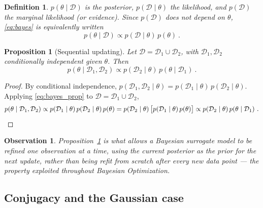 \documentclass{article}
\newtheorem{prop}{Proposition}
\newtheorem{defn}{Definition}
\newtheorem{obs}{Observation}
\begin{document}
	\begin{defn}
		$p(\theta \mid \mathcal{D})$ is the \textit{posterior}, $p(\mathcal{D} \mid \theta)$ the \textit{likelihood}, and $p(\mathcal{D})$ the \textit{marginal likelihood} (or \textit{evidence}). Since $p(\mathcal{D})$ does not depend on $\theta$, \eqref{eq:bayes} is equivalently written
		\begin{equation} \label{eq:bayes_prop}
			p(\theta \mid \mathcal{D}) \propto p(\mathcal{D} \mid \theta) \, p(\theta) \ .
		\end{equation}
	\end{defn}
	
	\begin{prop}[Sequential updating] \label{prop:seq_update}
		Let $\mathcal{D} = \mathcal{D}_1 \cup \mathcal{D}_2$, with $\mathcal{D}_1, \mathcal{D}_2$ conditionally independent given $\theta$. Then
		\begin{equation}
			p(\theta \mid \mathcal{D}_1, \mathcal{D}_2) \propto p(\mathcal{D}_2 \mid \theta) \, p(\theta \mid \mathcal{D}_1) \ .
		\end{equation}
	\end{prop}
	\begin{proof}
		By conditional independence, $p(\mathcal{D}_1, \mathcal{D}_2 \mid \theta) = p(\mathcal{D}_1 \mid \theta) \, p(\mathcal{D}_2 \mid \theta)$. Applying \eqref{eq:bayes_prop} to $\mathcal{D} = \mathcal{D}_1 \cup \mathcal{D}_2$,
		\begin{equation}
			p(\theta \mid \mathcal{D}_1, \mathcal{D}_2) \propto p(\mathcal{D}_1 \mid \theta) \, p(\mathcal{D}_2 \mid \theta) \, p(\theta) = p(\mathcal{D}_2 \mid \theta) \, \big[p(\mathcal{D}_1 \mid \theta) \, p(\theta)\big] \propto p(\mathcal{D}_2 \mid \theta) \, p(\theta \mid \mathcal{D}_1) \ . \qedhere
		\end{equation}
	\end{proof}
	
	\begin{obs}
		Proposition~\ref{prop:seq_update} is what allows a Bayesian surrogate model to be refined one observation at a time, using the current posterior as the prior for the next update, rather than being refit from scratch after every new data point — the property exploited throughout Bayesian Optimization.
	\end{obs}
	
	\subsection{Conjugacy and the Gaussian case}
	
\end{document}
